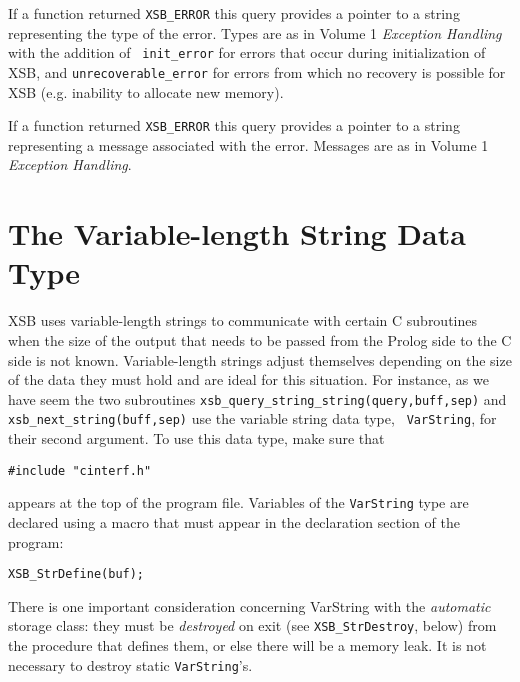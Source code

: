 \begin{description}
 
%
If a function returned {\tt XSB\_ERROR} this query provides a pointer
to a string representing the type of the error.  Types are as in
Volume 1 {\em Exception Handling} with the addition of {\tt
  init\_error} for errors that occur during initialization of XSB, and
{\tt unrecoverable\_error} for errors from which no recovery is
possible for XSB (e.g. inability to allocate new memory).

%
If a function returned {\tt XSB\_ERROR} this query provides a pointer
to a string representing a message associated with the error.
Messages are as in Volume 1 {\em Exception Handling}.

\end{description}

\section{The Variable-length String Data Type}\label{sec-varstring}

 XSB uses variable-length strings to communicate with
certain C subroutines when the size of the output that needs to be passed
from the Prolog side to the C side is not known. Variable-length strings
adjust themselves depending on the size of the data they must hold and are
ideal for this situation. For instance, as we have seem the two subroutines
{\tt xsb\_query\_string\_string(query,buff,sep)} and {\tt
  xsb\_next\_string(buff,sep)} use the variable string data type, {\tt
  VarString}, for their second argument.  To use this data type, make sure
that
\begin{verbatim}
#include "cinterf.h"  
\end{verbatim}
appears at the top of the program file.  Variables of the {\tt VarString}
type are declared using a macro that must appear in the declaration section
of the program:
\begin{verbatim}
XSB_StrDefine(buf);  
\end{verbatim}
There is one important consideration concerning VarString with the
\emph{automatic} storage class: they must be
\emph{destroyed} on exit (see {\tt XSB\_StrDestroy}, below) from the procedure
that defines them, or else there will be a memory leak. 
It is not necessary to destroy static {\tt VarString}'s.

